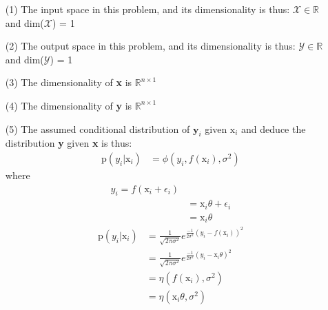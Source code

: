 \documentclass[12pt,a4paper]{article}
\begin{document}
\begin{enumerate}
	\item[(1)] The input space in this problem,  and  its dimensionality is thus: $\mathscr{X} \in \mathbb{R}$  and dim($\mathscr{X} $) = 1
	\item[(2)] The output space in this problem,  and  its dimensionality is thus: $\mathscr{Y} \in \mathbb{R}$  and dim($\mathscr{Y} $) = 1
	\item[(3)]  The dimensionality of \textbf{x} is $\mathbb{R}^{n \times 1}$ 
	\item[(4)]  The dimensionality of \textbf{y} is $\mathbb{R}^{n \times 1}$ 
	\item[(5)] The assumed conditional distribution of $\textbf{y}_i$ given $\mathrm{x}_i$ and deduce the distribution \textbf{y} given \textbf{x}  is thus:
	\begin{align*}
				\mathrm{p}(y_i | \mathrm{x}_i) &= \phi(y_i, f(\mathrm{x}_i), \sigma^2)
	\end{align*}
	where
		\begin{align*}
				y_i =  f(\mathrm{x}_i + \epsilon_i)\\
				    &=  \mathrm{x}_i \theta + \epsilon_i\\
				    &= \mathrm{x}_i \theta
		\end{align*}
	\begin{align*}
			\mathrm{p}(y_i | \mathrm{x}_i) &=  \frac{1}{\sqrt{2 \pi \sigma^2  }} e^{ \frac{-1}{ 2\sigma^2} (y_i - f(\mathrm{x}_i))^2 }\\
					&=  \frac{1}{\sqrt{2 \pi \sigma^2  }} e^{ \frac{-1}{ 2\sigma^2} (y_i - \mathrm{x}_i \theta )^2 }\\
					&=  \eta(f(\mathrm{x}_i),\sigma^2) \\
					&= \eta(\mathrm{x}_i \theta, \sigma^2)
	\end{align*}
	

\end{enumerate}
\end{document}
